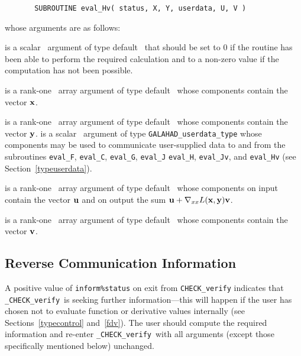 \documentclass{galahad}
\newcommand{\packagename}{CHECK}
\newcommand{\fullpackagename}{\libraryname\_\packagename}
\newcommand{\solver}{{\tt \fullpackagename\_verify}}
\begin{document}
\def\baselinestretch{0.8}
{\tt \begin{verbatim}
       SUBROUTINE eval_Hv( status, X, Y, userdata, U, V ) \end{verbatim} }
\def\baselinestretch{1.0}
\noindent whose arguments are as follows:

\begin{description}
 is a scalar \intentout\ argument of type default \integer\
that should be set to 0 if the routine has been able to perform the
required calculation and to a non-zero value if the computation has not
been possible. 

 is a rank-one \intentin\ array argument of type default \realdp\
whose components contain the vector ${\mathbf{x}}$.

 is a rank-one \intentin\ array argument of type default \realdp\
whose components contain the vector ${\mathbf{y}}$.
 is a scalar \intentinout\ argument of type 
{\tt GALAHAD\_userdata\_type} whose components may be used
to communicate user-supplied data to and from the
subroutines {\tt eval\_F}, {\tt eval\_C}, {\tt eval\_G}, {\tt eval\_J}
{\tt eval\_H}, {\tt eval\_Jv}, and {\tt eval\_Hv} 
(see Section~\ref{typeuserdata}). 

\ittf{U} is a rank-one \intentinout\ array argument of type default \realdp\
whose components on input contain the vector ${\mathbf{u}}$ and on output the
sum ${\mathbf{u}} + \nabla_{xx} L({\mathbf{x}},{\mathbf{y}}) {\mathbf{v}}$.

\ittf{V} is a rank-one \intentin\ array argument of type default \realdp\
whose components contain the vector ${\mathbf{v}}$.


\end{description}


\subsection{\label{reverse}Reverse Communication Information}

A positive value of {\tt inform\%status} on exit from 
{\tt \packagename\_verify}
indicates that
\solver\ is seeking further information---this will happen 
if the user has chosen not to evaluate function or 
derivative values internally (see Sections~\ref{typecontrol} and~\ref{fdv}).
The user should compute the required information and re-enter \solver\
with all arguments (except those specifically mentioned below) unchanged.
\end{document}
